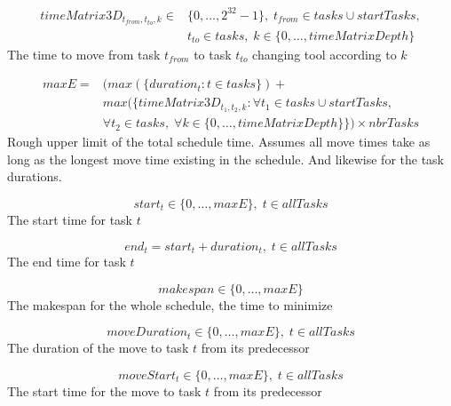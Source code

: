 \documentclass[10pt,a4paper]{report}
\begin{document}
\begin{equation}
\begin{aligned}\label{eq:44}
timeMatrix3D_{t_{from},t_{to},k} \in &\{0 , \ldots , 2^{32}-1\}, \; t_{from} \in tasks \cup startTasks,  \\ 
&t_{to} \in tasks, \; k \in \{0 , \ldots , timeMatrixDepth\}
\end{aligned}
\end{equation}
The time to move from task $t_{from}$ to task $t_{to}$ changing tool according to $k$

\begin{equation}
\begin{aligned}\label{eq:45}
maxE = &(max(\{duration_t : t \in tasks\}) +  \\ 
&max(\{timeMatrix3D_{t_1,t_2,k} : \forall t_1 \in tasks \cup startTasks,  \\ 
&\forall t_2 \in tasks, \; \forall k \in \{0 , \ldots , timeMatrixDepth\}\}) \times nbrTasks
\end{aligned}
\end{equation}
Rough upper limit of the total schedule time. Assumes all move times take as long as the longest move time existing in the schedule. And likewise for the task durations.

\begin{equation}\label{eq:46}
start_t \in \{0 , \ldots , maxE\}, \; t \in allTasks\end{equation}
The start time for task $t$

\begin{equation}\label{eq:47}
end_t = start_t + duration_t, \; t \in allTasks\end{equation}
The end time for task $t$

\begin{equation}\label{eq:48}
makespan \in \{0 , \ldots , maxE\}\end{equation}
The makespan for the whole schedule, the time to minimize

\begin{equation}\label{eq:49}
moveDuration_t \in \{0 , \ldots , maxE\}, \; t \in allTasks\end{equation}
The duration of the move to task $t$ from its predecessor

\begin{equation}\label{eq:50}
moveStart_t \in \{0 , \ldots , maxE\}, \; t \in allTasks\end{equation}
The start time for the move to task $t$ from its predecessor
\end{document}
